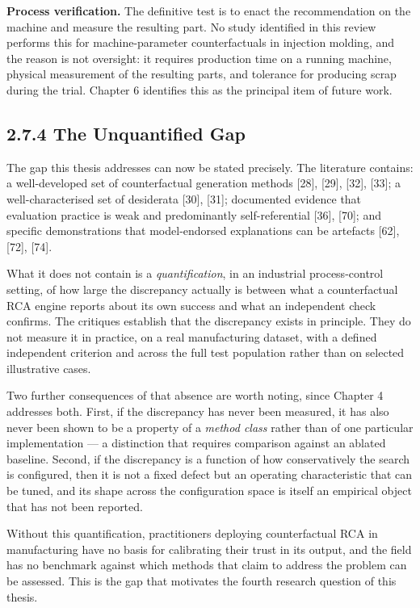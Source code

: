 \textbf{Process verification.} The definitive test is to enact the recommendation on the machine and measure the resulting part. No study identified in this review performs this for machine-parameter counterfactuals in injection molding, and the reason is not oversight: it requires production time on a running machine, physical measurement of the resulting parts, and tolerance for producing scrap during the trial. Chapter 6 identifies this as the principal item of future work.

\hypertarget{the-unquantified-gap}{%
\subsection{2.7.4 The Unquantified Gap}\label{the-unquantified-gap}}

The gap this thesis addresses can now be stated precisely. The literature contains: a well-developed set of counterfactual generation methods {[}28{]}, {[}29{]}, {[}32{]}, {[}33{]}; a well-characterised set of desiderata {[}30{]}, {[}31{]}; documented evidence that evaluation practice is weak and predominantly self-referential {[}36{]}, {[}70{]}; and specific demonstrations that model-endorsed explanations can be artefacts {[}62{]}, {[}72{]}, {[}74{]}.

What it does not contain is a \emph{quantification}, in an industrial process-control setting, of how large the discrepancy actually is between what a counterfactual RCA engine reports about its own success and what an independent check confirms. The critiques establish that the discrepancy exists in principle. They do not measure it in practice, on a real manufacturing dataset, with a defined independent criterion and across the full test population rather than on selected illustrative cases.

Two further consequences of that absence are worth noting, since Chapter 4 addresses both. First, if the discrepancy has never been measured, it has also never been shown to be a property of a \emph{method class} rather than of one particular implementation --- a distinction that requires comparison against an ablated baseline. Second, if the discrepancy is a function of how conservatively the search is configured, then it is not a fixed defect but an operating characteristic that can be tuned, and its shape across the configuration space is itself an empirical object that has not been reported.

Without this quantification, practitioners deploying counterfactual RCA in manufacturing have no basis for calibrating their trust in its output, and the field has no benchmark against which methods that claim to address the problem can be assessed. This is the gap that motivates the fourth research question of this thesis.

